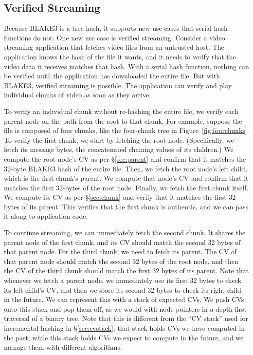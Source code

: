 \documentclass[11pt,notitlepage,a4paper]{article}
\begin{document}
\subsection{Verified Streaming}\label{sec:verifiedstreaming}

Because BLAKE3 is a tree hash, it supports new use cases that serial hash
functions do not. One new use case is verified streaming. Consider a video
streaming application that fetches video files from an untrusted host. The
application knows the hash of the file it wants, and it needs to verify that
the video data it receives matches that hash. With a serial hash function,
nothing can be verified until the application has downloaded the entire file.
But with BLAKE3, verified streaming is possible. The application can verify and
play individual chunks of video as soon as they arrive.

To verify an individual chunk without re-hashing the entire file, we verify
each parent node on the path from the root to that chunk. For example, suppose
the file is composed of four chunks, like the four-chunk tree in
Figure~\ref{fig:fourchunks}. To verify the first chunk, we start by fetching
the root node. (Specifically, we fetch its message bytes, the concatenated
chaining values of its children.) We compute the root node's CV as per
\S\ref{sec:parent} and confirm that it matches the 32-byte BLAKE3 hash of the
entire file. Then, we fetch the root node's left child, which is the first
chunk's parent. We compute that node's CV and confirm that it matches the first
32-bytes of the root node. Finally, we fetch the first chunk itself. We compute
its CV as per \S\ref{sec:chunk} and verify that it matches the first 32-bytes
of its parent. This verifies that the first chunk is authentic, and we can pass
it along to application code.

To continue streaming, we can immediately fetch the second chunk. It shares the
parent node of the first chunk, and its CV should match the second 32 bytes of
that parent node. For the third chunk, we need to fetch its parent. The CV of
that parent node should match the second 32 bytes of the root node, and then
the CV of the third chunk should match the first 32 bytes of its parent. Note
that whenever we fetch a parent node, we immediately use its first 32 bytes to
check its left child's CV, and then we store its second 32 bytes to check its
right child in the future. We can represent this with a stack of expected CVs.
We push CVs onto this stack and pop them off, as we would with node pointers in
a depth-first traversal of a binary tree. Note that this is different from the
``CV stack'' used for incremental hashing in \S\ref{sec:cvstack}; that stack
holds CVs we have computed in the past, while this stack holds CVs we expect to
compute in the future, and we manage them with different algorithms.
\end{document}
